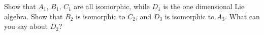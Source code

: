 Show that $A_1$, $B_1$, $C_1$ are all isomorphic, while $D_1$ is the one dimensional Lie algebra. Show that $B_2$ is isomorphic to $C_2$, and $D_3$ is isomorphic to $A_3$. What can you say about $D_2$?
